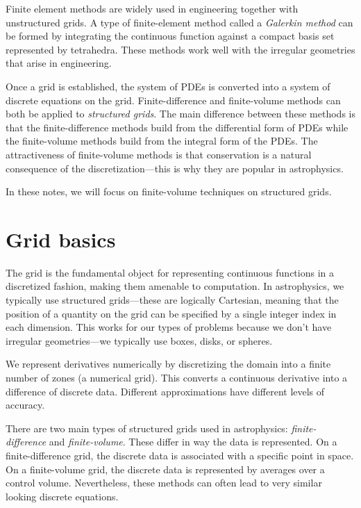 \ifdefined\debugmode
Finite element methods are
widely used in engineering together with unstructured grids.  A type
of finite-element method called a {\em Galerkin method} can be formed
by integrating the continuous function against a compact basis set
represented by tetrahedra.  These methods work well with the irregular
geometries that arise in engineering.  
\fi

Once a grid is established, the system of PDEs is converted into a
system of discrete equations on the grid.  Finite-difference and
finite-volume methods can both be applied to {\em structured grids}.
The main difference between these methods is that the
finite-difference methods build from the differential form of PDEs
while the finite-volume methods build from the integral form of the
PDEs.  The attractiveness of finite-volume methods is that
conservation is a natural consequence of the discretization---this is
why they are popular in astrophysics.

In these notes, we will focus on finite-volume techniques on
structured grids.


\section{Grid basics}

The grid is the fundamental object for representing continuous
functions in a discretized fashion, making them amenable to
computation.  In astrophysics, we typically use structured
grids---these are logically Cartesian, meaning that the position of a
quantity on the grid can be specified by a single integer index in
each dimension.  This works for our types of problems because
we don't have irregular geometries---we typically use boxes, disks,
or spheres.

We represent derivatives numerically by discretizing the domain into
a finite number of zones (a numerical grid).
This converts a continuous derivative into a difference of discrete data.
Different approximations have different levels of accuracy.

There are two main types of structured grids used in astrophysics:
{\em finite-difference} and {\em finite-volume}.  These differ in way
the data is represented.  On a finite-difference grid, the discrete
data is associated with a specific point in space.  On a
finite-volume grid, the discrete data is represented by averages over
a control volume.  Nevertheless, these methods can often lead to very
similar looking discrete equations.

